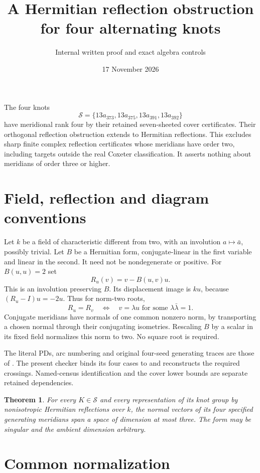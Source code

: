 \documentclass[11pt]{article}
\title{A Hermitian reflection obstruction for four alternating knots}
\author{Internal written proof and exact algebra controls}
\date{17 November 2026}
\newtheorem{theorem}{Theorem}
\begin{document}
\maketitle

The four knots
\[
 \mathcal S=\{13a_{373},13a_{375},13a_{391},13a_{392}\}
\]
have meridional rank four by their retained seven-sheeted cover
certificates. Their orthogonal reflection obstruction extends to
Hermitian reflections. This excludes sharp finite complex reflection
certificates whose meridians have order two, including targets outside
the real Coxeter classification. It asserts nothing about meridians
of order three or higher.

\section{Field, reflection and diagram conventions}

Let $k$ be a field of characteristic different from two, with an
involution $a\mapsto\bar a$, possibly trivial. Let $B$ be a Hermitian
form, conjugate-linear in the first variable and linear in the second.
It need not be nondegenerate or positive. For $B(u,u)=2$ set
\[
                         R_u(v)=v-B(u,v)u.
\]
This is an involution preserving $B$. Its displacement image is $ku$,
because $(R_u-I)u=-2u$. Thus for norm-two roots,
\[
 R_u=R_v\quad\Longleftrightarrow\quad
 v=\lambda u\text{ for some }\lambda\bar\lambda=1.
\]
Conjugate meridians have normals of one common nonzero norm, by
transporting a chosen normal through their conjugating isometries.
Rescaling $B$ by a scalar in its fixed field normalizes this norm to
two. No square root is required.

The literal PDs, arc numbering and original four-seed generating
traces are those of .
The present checker binds its four cases to
 and reconstructs the required
crossings. Named-census identification and the cover lower bounds
are separate retained dependencies.

\begin{theorem}\label{thm:hermitian}
For every $K\in\mathcal S$ and every representation of its knot group
by nonisotropic Hermitian reflections over $k$, the normal vectors
of its four specified generating meridians span a space of dimension
at most three. The form may be singular and the ambient dimension
arbitrary.
\end{theorem}

\section{Common normalization}
\end{document}
